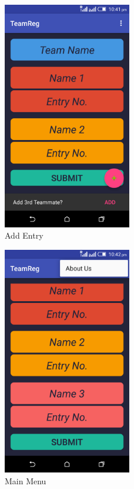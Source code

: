 \documentclass[12pt]{article}
\begin{document}
\begin{center}
\begin{figure}[!ht]
	\centering
	\includegraphics[width=0.5\textwidth]{5.png}
	\caption{Add Entry}
\end{figure}

\begin{figure}[!ht]
	\centering
	\includegraphics[width=0.5\textwidth]{6.png}
	\caption{Main Menu}
\end{figure}


\end{center}
\end{document}
